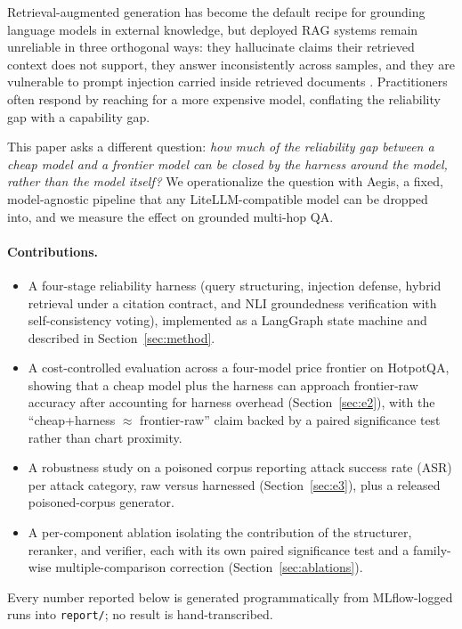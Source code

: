 \documentclass[twocolumn,10pt]{article}
\begin{document}
Retrieval-augmented generation \citep{lewis2020rag} has become the default
recipe for grounding language models in external knowledge, but deployed RAG
systems remain unreliable in three orthogonal ways: they hallucinate claims
their retrieved context does not support, they answer inconsistently across
samples, and they are vulnerable to prompt injection carried inside retrieved
documents \citep{greshake2023injection}. Practitioners often respond by
reaching for a more expensive model, conflating the reliability gap with a
capability gap.

This paper asks a different question: \emph{how much of the reliability gap
between a cheap model and a frontier model can be closed by the harness around
the model, rather than the model itself?} We operationalize the question with
Aegis, a fixed, model-agnostic pipeline that any LiteLLM-compatible model can
be dropped into, and we measure the effect on grounded multi-hop QA.

\paragraph{Contributions.}
\begin{itemize}
  \item A four-stage reliability harness (query structuring, injection
  defense, hybrid retrieval under a citation contract, and NLI groundedness
  verification with self-consistency voting), implemented as a LangGraph state
  machine and described in Section~\ref{sec:method}.
  \item A cost-controlled evaluation across a four-model price frontier on
  HotpotQA, showing that a cheap model plus the harness can approach
  frontier-raw accuracy after accounting for harness overhead
  (Section~\ref{sec:e2}), with the ``cheap+harness $\approx$ frontier-raw''
  claim backed by a paired significance test rather than chart proximity.
  \item A robustness study on a poisoned corpus reporting attack success rate
  (ASR) per attack category, raw versus harnessed
  (Section~\ref{sec:e3}), plus a released poisoned-corpus generator.
  \item A per-component ablation isolating the contribution of the structurer,
  reranker, and verifier, each with its own paired significance test and a
  family-wise multiple-comparison correction (Section~\ref{sec:ablations}).
\end{itemize}

Every number reported below is generated programmatically from MLflow-logged
runs into \texttt{report/}; no result is hand-transcribed.
\end{document}
